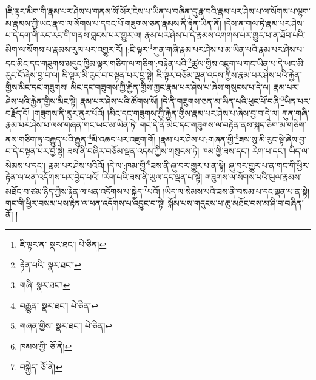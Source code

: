 །ཇི་ལྟར་མིག་གི་རྣམ་པར་ཤེས་པ་གནས་སོ་སོར་ངེས་པ་ཡིན་པ་བཞིན་དུ་རྣ་བའི་རྣམ་པར་ཤེས་པ་ལ་སོགས་པ་ལྷག་མ་རྣམས་ཀྱི་ཡང་རྣ་བ་ལ་སོགས་པ་དབང་པོ་གཟུགས་ཅན་རྣམས་ནི་རྟེན་ཡིན་ནོ། །དེས་ན་གལ་ཏེ་རྣམ་པར་ཤེས་པ་དེ་དག་གི་རང་རང་གི་གནས་བླངས་པར་གྱུར་ལ། རྣམ་པར་ཤེས་པ་དེ་རྣམས་འགགས་པར་གྱུར་པ་ན་ཐོབ་པའི་མིག་ལ་སོགས་པ་རྣམས་རུལ་པར་འགྱུར་རོ། །:ཇི་ལྟར་\footnote{ཇི་ལྟར་ན་  སྣར་ཐང་།  པེ་ཅིན། }ཀུན་གཞི་རྣམ་པར་ཤེས་པ་མ་ཡིན་པའི་རྣམ་པར་ཤེས་པ་དང་མིང་དང་གཟུགས་མདུང་ཁྱིམ་ལྟར་གཅིག་ལ་གཅིག་:བརྟེན་པའི་\footnote{རྟེན་པའི་  སྣར་ཐང་། }ཚུལ་གྱིས་འཇུག་པ་གང་ཡིན་པ་དེ་ཡང་མི་རུང་ངོ་ཞེས་བྱ་བ་ལ། ཇི་ལྟར་མི་རུང་བ་བསྟན་པར་བྱ་སྟེ། ཇི་ལྟར་བཅོམ་ལྡན་འདས་ཀྱིས་རྣམ་པར་ཤེས་པའི་རྐྱེན་གྱིས་མིང་དང་གཟུགས། མིང་དང་གཟུགས་ཀྱི་རྐྱེན་གྱིས་ཀྱང་རྣམ་པར་ཤེས་པ་ཞེས་གསུངས་པ་དེ་ལ། རྣམ་པར་ཤེས་པའི་རྐྱེན་གྱིས་མིང་སྟེ། རྣམ་པར་ཤེས་པའི་ཚོགས་སོ། །དེ་ནི་གཟུགས་ཅན་མ་ཡིན་པའི་ཕུང་པོ་བཞི་\footnote{གཞི་  སྣར་ཐང་། }ཡིན་པར་བརྗོད་དོ། །གཟུགས་ནི་ནུར་ནུར་པོའོ། །མིང་དང་གཟུགས་ཀྱི་རྐྱེན་གྱིས་རྣམ་པར་ཤེས་པ་ཞེས་བྱ་བ་དེ་ལ། ཀུན་གཞི་རྣམ་པར་ཤེས་པ་ལས་གཞན་གང་ཡང་མ་ཡིན་ཏེ། གང་དེ་ནི་མིང་དང་གཟུགས་ལ་བརྟེན་ནས་སྐད་ཅིག་མ་གཅིག་ནས་གཅིག་ཏུ་བརྒྱུད་པའི་རྒྱུན་\footnote{བརྒྱུན་  སྣར་ཐང་།  པེ་ཅིན། }མི་འཆད་པར་འཇུག་གོ། །རྣམ་པར་ཤེས་པ་:གཞན་གྱི་\footnote{གཞན་གྱིས་  སྣར་ཐང་།  པེ་ཅིན། }ཟས་སུ་མི་རུང་སྟེ་ཞེས་བྱ་བ་དེ་བསྟན་པར་བྱ་སྟེ། ཟས་ནི་བཞིར་བཅོམ་ལྡན་འདས་ཀྱིས་གསུངས་ཏེ། ཁམ་གྱི་ཟས་དང་། རེག་པ་དང་། ཡིད་ལ་སེམས་པ་དང་། རྣམ་པར་ཤེས་པའིའོ། །དེ་ལ་:ཁམ་གྱི་\footnote{ཁམས་ཀྱི་  ཅོ་ནེ། }ཟས་ནི་ཞུ་བར་གྱུར་པ་ན་སྟེ། ཞུ་བར་གྱུར་པ་ན་གང་གི་ཕྱིར་རྟེན་ལ་ཕན་འདོགས་པར་བྱེད་པའོ། །རེག་པའི་ཟས་ནི་ཡུལ་དང་ལྡན་པ་སྟེ། གཟུགས་ལ་སོགས་པའི་ཡུལ་རྣམས་མཐོང་བ་ཙམ་ཉིད་ཀྱིས་རྟེན་ལ་ཕན་འདོགས་པ་སྐྱེད་\footnote{བསྐྱེད་  ཅོ་ནེ། }པའོ། །ཡིད་ལ་སེམས་པའི་ཟས་ནི་བསམ་པ་དང་ལྡན་པ་ན་སྟེ། གང་གི་ཕྱིར་བསམ་པས་རྟེན་ལ་ཕན་འདོགས་པ་འབྱུང་བ་སྟེ། སྐོམ་པས་གདུངས་པ་ཆུ་མཐོང་བས་མ་ཤི་བ་བཞིན་ནོ། །
